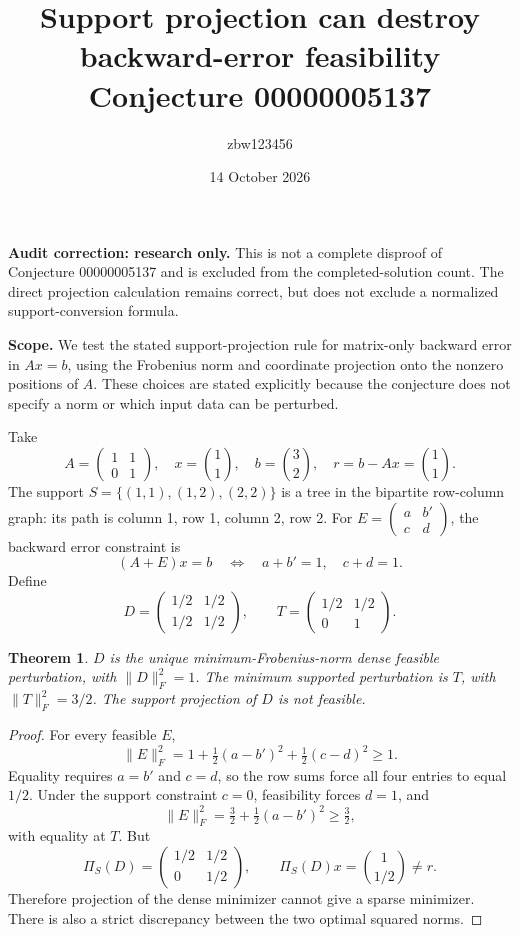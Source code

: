 \documentclass[11pt]{article}
\title{Support projection can destroy backward-error feasibility\\\large Conjecture 00000005137}
\author{zbw123456}\date{14 October 2026}
\newtheorem{theorem}{Theorem}
\begin{document}
\maketitle
\textbf{Audit correction: research only.} This is not a complete disproof of Conjecture 00000005137 and is excluded from the completed-solution count. The direct projection calculation remains correct, but does not exclude a normalized support-conversion formula.

\textbf{Scope.} We test the stated support-projection rule for matrix-only
backward error in $Ax=b$, using the Frobenius norm and coordinate projection
onto the nonzero positions of $A$. These choices are stated explicitly because
the conjecture does not specify a norm or which input data can be perturbed.

Take
\[
 A=\begin{pmatrix}1&1\\0&1\end{pmatrix},\quad
 x=\binom11,\quad b=\binom32,\quad r=b-Ax=\binom11.
\]
The support $S=\{(1,1),(1,2),(2,2)\}$ is a tree in the bipartite row-column
graph: its path is column 1, row 1, column 2, row 2.
For $E=\left(\begin{smallmatrix}a&b'\\c&d\end{smallmatrix}\right)$, the backward
error constraint is
\[
 (A+E)x=b\quad\Longleftrightarrow\quad a+b'=1,\quad c+d=1.
\]
Define
\[
 D=\begin{pmatrix}1/2&1/2\\1/2&1/2\end{pmatrix},\qquad
 T=\begin{pmatrix}1/2&1/2\\0&1\end{pmatrix}.
\]
\begin{theorem}
$D$ is the unique minimum-Frobenius-norm dense feasible perturbation, with
$\|D\|_F^2=1$. The minimum supported perturbation is $T$, with
$\|T\|_F^2=3/2$. The support projection of $D$ is not feasible.
\end{theorem}
\begin{proof}
For every feasible $E$,
\[
 \|E\|_F^2
 =1+\tfrac12(a-b')^2+\tfrac12(c-d)^2\ge1.
\]
Equality requires $a=b'$ and $c=d$, so the row sums force all four entries
to equal $1/2$. Under the support constraint $c=0$, feasibility forces $d=1$,
and
\[
 \|E\|_F^2=\tfrac32+\tfrac12(a-b')^2\ge\tfrac32,
\]
with equality at $T$. But
\[
 \Pi_S(D)=\begin{pmatrix}1/2&1/2\\0&1/2\end{pmatrix},\qquad
 \Pi_S(D)x=\binom{1}{1/2}\ne r.
\]
Therefore projection of the dense minimizer cannot give a sparse minimizer.
There is also a strict discrepancy between the two optimal squared norms.
\end{proof}
\end{document}
